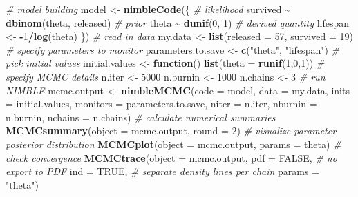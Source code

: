 \documentclass[
  12pt,
]{krantz}
\newenvironment{Shaded}{\begin{snugshade}}{\end{snugshade}}
\newcommand{\AttributeTok}[1]{\textcolor[rgb]{0.13,0.29,0.53}{#1}}
\newcommand{\CommentTok}[1]{\textcolor[rgb]{0.56,0.35,0.01}{\textit{#1}}}
\newcommand{\ConstantTok}[1]{\textcolor[rgb]{0.56,0.35,0.01}{#1}}
\newcommand{\ControlFlowTok}[1]{\textcolor[rgb]{0.13,0.29,0.53}{\textbf{#1}}}
\newcommand{\DecValTok}[1]{\textcolor[rgb]{0.00,0.00,0.81}{#1}}
\newcommand{\FunctionTok}[1]{\textcolor[rgb]{0.13,0.29,0.53}{\textbf{#1}}}
\newcommand{\NormalTok}[1]{#1}
\newcommand{\OtherTok}[1]{\textcolor[rgb]{0.56,0.35,0.01}{#1}}
\newcommand{\SpecialCharTok}[1]{\textcolor[rgb]{0.81,0.36,0.00}{\textbf{#1}}}
\newcommand{\StringTok}[1]{\textcolor[rgb]{0.31,0.60,0.02}{#1}}
\begin{document}
\begin{Shaded}
\begin{Highlighting}[]
\CommentTok{\# model building}
\NormalTok{model }\OtherTok{\textless{}{-}} \FunctionTok{nimbleCode}\NormalTok{(\{}
  \CommentTok{\# likelihood}
\NormalTok{  survived }\SpecialCharTok{\textasciitilde{}} \FunctionTok{dbinom}\NormalTok{(theta, released)}
  \CommentTok{\# prior}
\NormalTok{  theta }\SpecialCharTok{\textasciitilde{}} \FunctionTok{dunif}\NormalTok{(}\DecValTok{0}\NormalTok{, }\DecValTok{1}\NormalTok{)}
  \CommentTok{\# derived quantity}
\NormalTok{  lifespan }\OtherTok{\textless{}{-}} \SpecialCharTok{{-}}\DecValTok{1}\SpecialCharTok{/}\FunctionTok{log}\NormalTok{(theta)}
\NormalTok{\})}
\CommentTok{\# read in data}
\NormalTok{my.data }\OtherTok{\textless{}{-}} \FunctionTok{list}\NormalTok{(}\AttributeTok{released =} \DecValTok{57}\NormalTok{, }\AttributeTok{survived =} \DecValTok{19}\NormalTok{)}
\CommentTok{\# specify parameters to monitor}
\NormalTok{parameters.to.save }\OtherTok{\textless{}{-}} \FunctionTok{c}\NormalTok{(}\StringTok{"theta"}\NormalTok{, }\StringTok{"lifespan"}\NormalTok{)}
\CommentTok{\# pick initial values}
\NormalTok{initial.values }\OtherTok{\textless{}{-}} \ControlFlowTok{function}\NormalTok{() }\FunctionTok{list}\NormalTok{(}\AttributeTok{theta =} \FunctionTok{runif}\NormalTok{(}\DecValTok{1}\NormalTok{,}\DecValTok{0}\NormalTok{,}\DecValTok{1}\NormalTok{))}
\CommentTok{\# specify MCMC details}
\NormalTok{n.iter }\OtherTok{\textless{}{-}} \DecValTok{5000}
\NormalTok{n.burnin }\OtherTok{\textless{}{-}} \DecValTok{1000}
\NormalTok{n.chains }\OtherTok{\textless{}{-}} \DecValTok{3}
\CommentTok{\# run NIMBLE}
\NormalTok{mcmc.output }\OtherTok{\textless{}{-}} \FunctionTok{nimbleMCMC}\NormalTok{(}\AttributeTok{code =}\NormalTok{ model,}
                          \AttributeTok{data =}\NormalTok{ my.data,}
                          \AttributeTok{inits =}\NormalTok{ initial.values,}
                          \AttributeTok{monitors =}\NormalTok{ parameters.to.save,}
                          \AttributeTok{niter =}\NormalTok{ n.iter,}
                          \AttributeTok{nburnin =}\NormalTok{ n.burnin,}
                          \AttributeTok{nchains =}\NormalTok{ n.chains)}
\CommentTok{\# calculate numerical summaries}
\FunctionTok{MCMCsummary}\NormalTok{(}\AttributeTok{object =}\NormalTok{ mcmc.output, }\AttributeTok{round =} \DecValTok{2}\NormalTok{)}
\CommentTok{\# visualize parameter posterior distribution}
\FunctionTok{MCMCplot}\NormalTok{(}\AttributeTok{object =}\NormalTok{ mcmc.output, }
         \AttributeTok{params =} \StringTok{\textquotesingle{}theta\textquotesingle{}}\NormalTok{)}
\CommentTok{\# check convergence}
\FunctionTok{MCMCtrace}\NormalTok{(}\AttributeTok{object =}\NormalTok{ mcmc.output,}
          \AttributeTok{pdf =} \ConstantTok{FALSE}\NormalTok{, }\CommentTok{\# no export to PDF}
          \AttributeTok{ind =} \ConstantTok{TRUE}\NormalTok{, }\CommentTok{\# separate density lines per chain}
          \AttributeTok{params =} \StringTok{"theta"}\NormalTok{)}
\end{Highlighting}
\end{Shaded}
\end{document}
